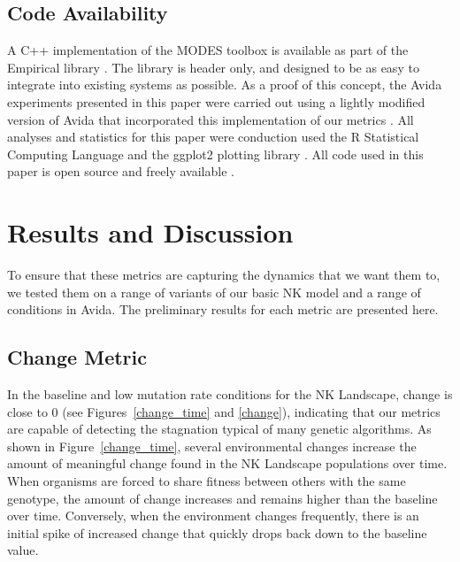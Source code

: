 \documentclass[letterpaper]{article}
\begin{document}
\subsection{Code Availability}
A C++ implementation of the MODES toolbox is available as part of the Empirical library \citep{charles_ofria_2018_1439475}. The library is header only, and designed to be as easy to integrate into existing systems as possible. As a proof of this concept, the Avida experiments presented in this paper were carried out using a lightly modified version of Avida that incorporated this implementation of our metrics \citep{david_bryson_2018_1439479}. All analyses and statistics for this paper were conduction used the R Statistical Computing Language \citep{r_core_team_r:_2017} and the ggplot2 plotting library \citep{wickham_ggplot2_2016}. All code used in this paper is open source and freely available \citep{emily_dolson_2018_1442642}.


\section{Results and Discussion}
To ensure that these metrics are capturing the dynamics that we want them to, we tested them on a range of variants of our basic NK model and a range of conditions in Avida. The preliminary results for each metric are presented here.

\subsection{Change Metric}
In the baseline and low mutation rate conditions for the NK Landscape, change is close to 0 (see Figures~\ref{change_time} and \ref{change}), indicating that our metrics are capable of detecting the stagnation typical of many genetic algorithms. As shown in Figure~\ref{change_time}, several environmental changes increase the amount of meaningful change found in the NK Landscape populations over time. When organisms are forced to share fitness between others with the same genotype, the amount of change increases and remains higher than the baseline over time. Conversely, when the environment changes frequently, there is an initial spike of increased change that quickly drops back down to the baseline value.
\end{document}

